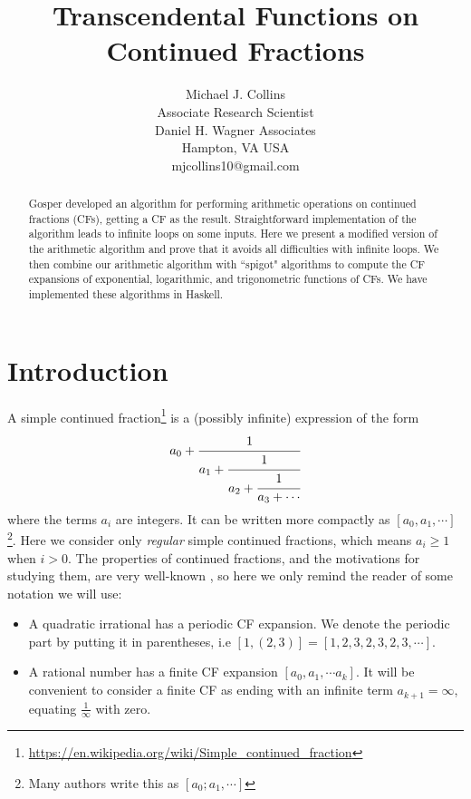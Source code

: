 \documentclass[11pt, oneside]{amsart}   	%
\title{Transcendental Functions on Continued Fractions}
\author{Michael J. Collins\\Associate Research Scientist\\Daniel H. Wagner Associates\\Hampton, VA USA\\mjcollins10@gmail.com}
\renewcommand{\:}{\negthickspace:\negthickspace}
\begin{document}
\begin{abstract}
Gosper  developed an algorithm for performing arithmetic operations on continued fractions (CFs), getting a CF as the result. Straightforward implementation of the algorithm leads to infinite loops on some inputs.
Here we present a modified version of the arithmetic algorithm and prove that it avoids all difficulties with infinite loops.
We then combine our arithmetic algorithm with ``spigot" algorithms to compute the CF expansions of exponential, logarithmic, and trigonometric functions of CFs.
We have implemented these algorithms in Haskell.
\end{abstract}

\maketitle

\section{Introduction}
A simple continued fraction\footnote{\href{https://en.wikipedia.org/wiki/Simple\_continued\_fraction}{https://en.wikipedia.org/wiki/Simple\_continued\_fraction}} is a (possibly infinite) expression of the form
\begin{equation*}
a_0+\cfrac{1}{a_1+\cfrac{1}{a_2+\cfrac{1}{a_3+\cdots}}}
\end{equation*}
where the terms $a_i$ are integers. It can be written more compactly as $[a_0, a_1, \cdots]$\footnote{Many authors write this as $[a_0; a_1, \cdots]$}. Here we consider only \emph{regular} simple continued fractions, which means $a_i \geq 1$ when $i>0$. The
properties of continued fractions, and the motivations for studying them, are very well-known \cite{rockett1992continued},
so here we only remind the reader of some notation we will use:
\begin{itemize}
\item A quadratic irrational has a periodic CF expansion. We denote the periodic part by putting it in parentheses,
i.e $[1,(2,3)] = [1,2,3,2,3,2,3,\cdots]$.
\item A rational number has a finite CF expansion $[a_0,a_1, \cdots a_k]$.
It will be convenient to consider a finite CF as ending with an infinite term $a_{k+1}=\infty$, equating $\frac{1}{\infty}$ with zero.
\end{itemize}
 
\end{document}
